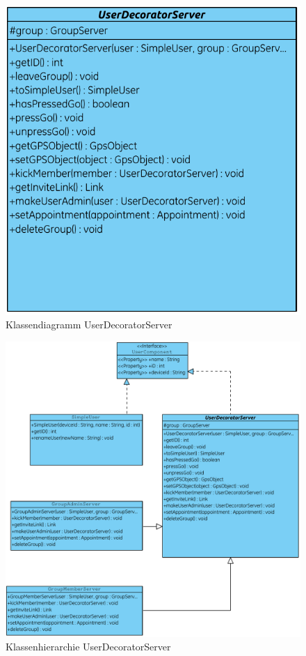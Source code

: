 \\ \\ \\
\begin{figure}[h]
     \centering
     \includegraphics[scale=0.9]{servergraphs/user-decorator-server.pdf}
     \caption{Klassendiagramm UserDecoratorServer}
\end{figure}
\clearpage

\begin{figure}[h]
     \centering
     \hspace*{-2.6cm}\includegraphics[scale=0.9]{servergraphs/user-component.pdf}
     \caption{Klassenhierarchie UserDecoratorServer}
\end{figure}
\clearpage

